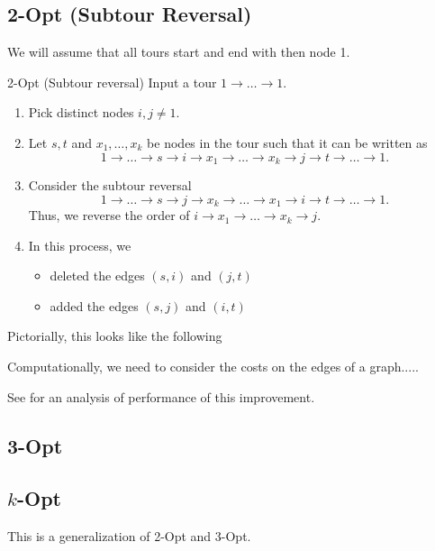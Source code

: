 \subsection{2-Opt (Subtour Reversal)}
We will assume that all tours start and end with then node 1.  

\begin{general}{2-Opt (Subtour reversal)}{}
Input a tour $1 \to \dots \to 1$. 
\begin{enumerate}
\item Pick distinct nodes $i,j \neq 1$.
\item Let $s,t$ and $x_1, \dots, x_k$ be nodes in the tour such that it can be written as 
$$
1 \to \dots \to s \to i \to x_1 \to \dots \to x_k  \to j \to t \to \dots \to 1.
$$
\item Consider the subtour reversal
$$
1 \to \dots \to s \to j \to x_k \to \dots \to x_1  \to i \to t \to \dots \to 1.
$$
Thus, we reverse the order of $ i \to x_1 \to \dots \to x_k \to j$.  
\item In this process, we 
\begin{itemize}
\item deleted the edges $(s,i)$ and $(j,t)$
\item added the edges $(s,j)$ and $(i,t)$
\end{itemize}
\end{enumerate}
\end{general}
Pictorially, this looks like the following 


Computationally, we need to consider the costs on the edges of a graph.....


See 
\cite{Englert2014} for an analysis of performance of this improvement.
\subsection{3-Opt}


\subsection{$k$-Opt}
This is a generalization of 2-Opt and 3-Opt.

